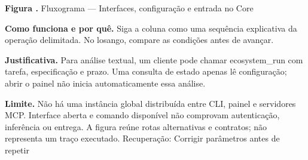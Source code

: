 {\small\textbf{Figura \thefigure.} Fluxograma --- Interfaces, configuração e entrada no Core}\par\smallskip
\noindent\textbf{Como funciona e por quê.} Siga a coluna como uma sequência explicativa da operação delimitada. No losango, compare as condições antes de avançar.\par
\noindent\textbf{Justificativa.} Para análise textual, um cliente pode chamar ecosystem\_run com tarefa, especificação e prazo. Uma consulta de estado apenas lê configuração; abrir o painel não inicia automaticamente essa análise.\par
\noindent\textbf{Limite.} Não há uma instância global distribuída entre CLI, painel e servidores MCP. Interface aberta e comando disponível não comprovam autenticação, inferência ou entrega. A figura reúne rotas alternativas e contratos; não representa um traço executado. Recuperação: Corrigir parâmetros antes de repetir\par\smallskip
{}
